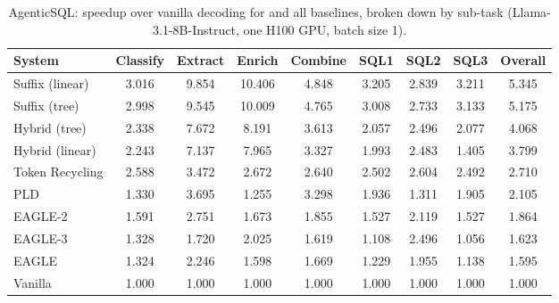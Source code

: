 \begin{table}[htbp]
\centering
\caption{AgenticSQL: speedup over vanilla decoding for \SuffixDecoding and all baselines, broken down by sub-task (Llama-3.1-8B-Instruct, one H100 GPU, batch size 1).}
\label{suffixdecoding:tab:sql-speedup}
\small
\begin{adjustbox}{width=\linewidth}
\begin{tabular}{lcccccccc}
\toprule
\textbf{System} & Classify & Extract & Enrich & Combine & SQL1 & SQL2 & SQL3 & \textbf{Overall} \\
\midrule
Suffix (linear) & 3.016 & 9.854 & 10.406 & 4.848 & 3.205 & 2.839 & 3.211 & 5.345 \\
Suffix (tree) & 2.998 & 9.545 & 10.009 & 4.765 & 3.008 & 2.733 & 3.133 & 5.175 \\
Hybrid (tree) & 2.338 & 7.672 & 8.191 & 3.613 & 2.057 & 2.496 & 2.077 & 4.068 \\
Hybrid (linear) & 2.243 & 7.137 & 7.965 & 3.327 & 1.993 & 2.483 & 1.405 & 3.799 \\
Token Recycling & 2.588 & 3.472 & 2.672 & 2.640 & 2.502 & 2.604 & 2.492 & 2.710 \\
PLD & 1.330 & 3.695 & 1.255 & 3.298 & 1.936 & 1.311 & 1.905 & 2.105 \\
EAGLE-2 & 1.591 & 2.751 & 1.673 & 1.855 & 1.527 & 2.119 & 1.527 & 1.864 \\
EAGLE-3 & 1.328 & 1.720 & 2.025 & 1.619 & 1.108 & 2.496 & 1.056 & 1.623 \\
EAGLE & 1.324 & 2.246 & 1.598 & 1.669 & 1.229 & 1.955 & 1.138 & 1.595 \\
Vanilla & 1.000 & 1.000 & 1.000 & 1.000 & 1.000 & 1.000 & 1.000 & 1.000 \\
\bottomrule
\end{tabular}
\end{adjustbox}
\end{table}

